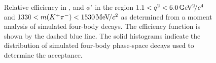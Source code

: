 \begin{figure}[!tb]
  \caption{Relative efficiency in \ctl, \ctk and $\phi'$ in the region $1.1<{q^2}<6.0{\mathrm{\,Ge\kern -0.1em V^2\!/}c^4}$ and $1330<m({{K}^+}{{\pi}^-})<1530{\mathrm{\,Me\kern -0.1em V\!/}c^2}$ as determined from a moment analysis of simulated four-body \BdToKpimm decays. The efficiency function is shown by the dashed blue line.  The solid histograms indicate the distribution of simulated four-body \BdToKpimm phase-space decays used to determine the acceptance.}
\label{fig:acceptance}
\end{figure}
